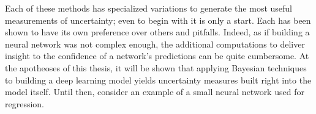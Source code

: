 Each of these methods has specialized variations to generate the most useful measurements of uncertainty; even to begin with it is only a start.  Each has been shown to have its own preference over others and pitfalls.  Indeed, as if building a neural network was not complex enough, the additional computations to deliver insight to the confidence of a network's predictions can be quite cumbersome. At the apotheoses of this thesis, it will be shown that applying Bayesian techniques to building a deep learning model yields uncertainty measures built right into the model itself.  Until then, consider an example of a small neural network used for regression.

